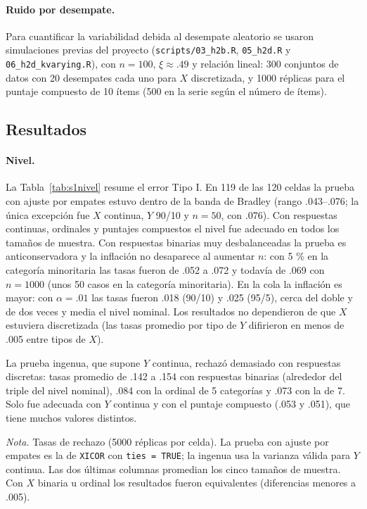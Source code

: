 \documentclass[man,donotrepeattitle,floatsintext]{apa7}
\begin{document}
\paragraph{Ruido por desempate.} Para cuantificar la variabilidad debida al desempate aleatorio se usaron simulaciones previas del proyecto (\texttt{scripts/03\_h2b.R}, \texttt{05\_h2d.R} y \texttt{06\_h2d\_kvarying.R}), con $n=100$, $\xi\approx .49$ y relación lineal: 300 conjuntos de datos con 20 desempates cada uno para $X$ discretizada, y 1000 réplicas para el puntaje compuesto de 10 ítems (500 en la serie según el número de ítems).

\subsection{Resultados}

\paragraph{Nivel.} La Tabla~\ref{tab:s1nivel} resume el error Tipo I. En 119 de las 120 celdas la prueba con ajuste por empates estuvo dentro de la banda de Bradley (rango .043--.076; la única excepción fue $X$ continua, $Y$ 90/10 y $n=50$, con .076). Con respuestas continuas, ordinales y puntajes compuestos el nivel fue adecuado en todos los tamaños de muestra. Con respuestas binarias muy desbalanceadas la prueba es anticonservadora y la inflación no desaparece al aumentar $n$: con 5 \% en la categoría minoritaria las tasas fueron de .052 a .072 y todavía de .069 con $n=1000$ (unos 50 casos en la categoría minoritaria). En la cola la inflación es mayor: con $\alpha=.01$ las tasas fueron .018 (90/10) y .025 (95/5), cerca del doble y de dos veces y media el nivel nominal. Los resultados no dependieron de que $X$ estuviera discretizada (las tasas promedio por tipo de $Y$ difirieron en menos de .005 entre tipos de $X$).

La prueba ingenua, que supone $Y$ continua, rechazó demasiado con respuestas discretas: tasas promedio de .142 a .154 con respuestas binarias (alrededor del triple del nivel nominal), .084 con la ordinal de 5 categorías y .073 con la de 7. Solo fue adecuada con $Y$ continua y con el puntaje compuesto (.053 y .051), que tiene muchos valores distintos.

\begin{table}
\caption{Error Tipo I de la prueba de $\xi_n$ bajo independencia, con $X$ continua}
\label{tab:s1nivel}
\begin{threeparttable}
\small

\begin{tablenotes}[flushleft]
\small
\item \textit{Nota.} Tasas de rechazo (5000 réplicas por celda). La prueba con ajuste por empates es la de \texttt{XICOR} con \texttt{ties = TRUE}; la ingenua usa la varianza válida para $Y$ continua. Las dos últimas columnas promedian los cinco tamaños de muestra. Con $X$ binaria u ordinal los resultados fueron equivalentes (diferencias menores a .005).
\end{tablenotes}
\end{threeparttable}
\end{table}
\end{document}
